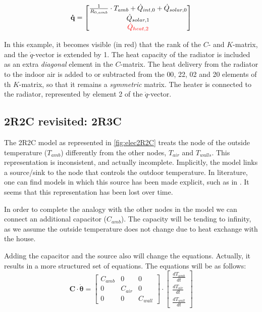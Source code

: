 \begin{equation}
	\mathbf{\dot{q}} =
	\begin{bmatrix}
		\frac{1}{R_{0, amb}} \cdot T_{amb} + \dot{Q}_{int, 0} + \dot{Q}_{solar, 0} \\
		\dot{Q}_{solar, 1} \\
		\color{red} \dot{Q}_{heat, 2}
	\end{bmatrix}
\end{equation}

In this example, it becomes visible (in red) that the rank of the $C$- and $K$-matrix, and the $\dot{q}$-vector is extended by 1. The heat capacity of the radiator is included as an extra \emph{diagonal} element in the $C$-matrix. The heat delivery from the radiator to the indoor air is added to or subtracted from the {00}, {22}, {02} and {20} elements of th $K$-matrix, so that it remains a \emph{symmetric} matrix. The heater is connected to the radiator, represented by element {2} of the $\dot{q}$-vector. 

\subsection{2R2C revisited: 2R3C}
\label{sec:2R3C}
The 2R2C model as represented in \ref{fig:elec2R2C} treats the node of the outside temperature ($T_{amb}$) differently from the other nodes, $T_{air}$ and $T_{walls}$.  This representation is inconsistent, and actually incomplete. Implicitly, the model links a source/sink to the node that controls the outdoor temperature. In literature, one can find models in which this source has been made explicit, such as in \cite{achterbos}. It seems that this representation has been lost over time. 

In order to complete the analogy with the other nodes in the model we can connect an additional capacitor ($C_{amb}$). The capacity will be tending to infinity, as we assume the outside temperature does not  change due to heat exchange with the house.


Adding the capacitor and the source also will change the equations. Actually, it results in a more structured set of equations. The equations will be as follows:
\begin{equation}
	\mathbf{C} \cdot \boldsymbol{\dot{\theta}} =
	\begin{bmatrix}
		C_{amb} & 0 & 0\\
		0 &  C_{air} & 0   \\
		0 & 0 & C_{wall} 
	\end{bmatrix}
	\cdot
	\begin{bmatrix}
		\frac{dT_{amb}}{dt} \\
		\frac{dT_{air}}{dt} \\
		\frac{dT_{wall}}{dt} 
	\end{bmatrix}
\end{equation}

